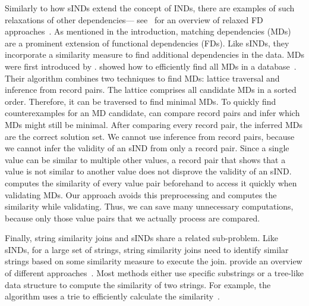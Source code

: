 Similarly to how sINDs extend the concept of INDs, there are examples of such relaxations of other dependencies--- see~\citeauthor{caruccio2016relaxed} for an overview of relaxed FD approaches~\cite{caruccio2016relaxed}.
As mentioned in the introduction, matching dependencies (MDs) are a prominent extension of functional dependencies (FDs).
Like sINDs, they incorporate a similarity measure to find additional dependencies in the data.
MDs were first introduced by \textcite{fan2008dependencies}.
\citeauthor{MDDiscovery} showed how to efficiently find all MDs in a database~\cite{MDDiscovery}.
Their  algorithm combines two techniques to find MDs: lattice traversal and inference from record pairs.
The lattice comprises all candidate MDs in a sorted order.
Therefore, it can be traversed to find minimal MDs.
To quickly find counterexamples for an MD candidate,  can compare record pairs and infer which MDs might still be minimal.
After comparing every record pair, the inferred MDs are the correct solution set.
We cannot use inference from record pairs, because we cannot infer the validity of an sIND from only a record pair.
Since a single value can be similar to multiple other values, a record pair that shows that a value is not similar to another value does not disprove the validity of an sIND.
 computes the similarity of every value pair beforehand to access it quickly when validating MDs.
Our approach avoids this preprocessing and computes the similarity while validating.
Thus, we can save many unnecessary computations, because only those value pairs that we actually process are compared.

Finally, string similarity joins and sINDs share a related sub-problem.
Like sINDs, for a large set of strings, string similarity joins need to identify similar strings based on some similarity measure to execute the join.
\citeauthor{StringSimSurvey} provide an overview of different approaches~\cite{StringSimSurvey}.
Most methods either use specific substrings or a tree-like data structure to compute the similarity of two strings.
For example, the algorithm  uses a trie to efficiently calculate the similarity~\cite{feng2012trie}.


